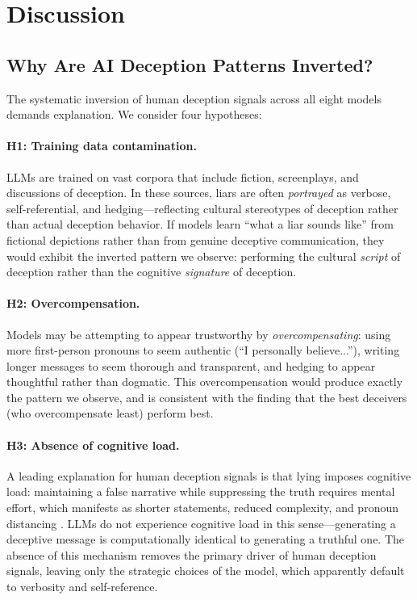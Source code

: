 \section{Discussion}
\label{sec:discussion}

\subsection{Why Are AI Deception Patterns Inverted?}

The systematic inversion of human deception signals across all eight models demands explanation. We consider four hypotheses:

\paragraph{H1: Training data contamination.} LLMs are trained on vast corpora that include fiction, screenplays, and discussions of deception. In these sources, liars are often \emph{portrayed} as verbose, self-referential, and hedging---reflecting cultural stereotypes of deception rather than actual deception behavior. If models learn ``what a liar sounds like'' from fictional depictions rather than from genuine deceptive communication, they would exhibit the inverted pattern we observe: performing the cultural \emph{script} of deception rather than the cognitive \emph{signature} of deception.

\paragraph{H2: Overcompensation.} Models may be attempting to appear trustworthy by \emph{overcompensating}: using more first-person pronouns to seem authentic (``I personally believe...''), writing longer messages to seem thorough and transparent, and hedging to appear thoughtful rather than dogmatic. This overcompensation would produce exactly the pattern we observe, and is consistent with the finding that the best deceivers (who overcompensate least) perform best.

\paragraph{H3: Absence of cognitive load.} A leading explanation for human deception signals is that lying imposes cognitive load: maintaining a false narrative while suppressing the truth requires mental effort, which manifests as shorter statements, reduced complexity, and pronoun distancing \citep{vrij2008detecting}. LLMs do not experience cognitive load in this sense---generating a deceptive message is computationally identical to generating a truthful one. The absence of this mechanism removes the primary driver of human deception signals, leaving only the strategic choices of the model, which apparently default to verbosity and self-reference.

